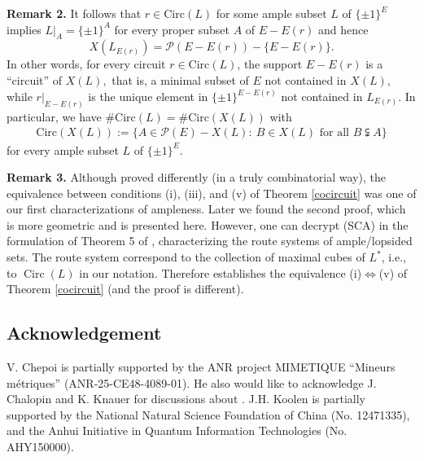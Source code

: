 \documentclass[11pt,a4paper]{amsart}
\theoremstyle{definition}
\numberwithin{equation}{section}
\DeclareMathOperator{\Circ}{Circ}
\newcommand{\covectors}{\ensuremath{L}}
\newcommand{\X}{\ensuremath{X}}
\begin{document}
\noindent
{\bf Remark 2.}  It follows that $r\in \mbox{Circ}({\covectors})$ for some
ample subset  ${\covectors}$ of $\{ \pm 1\}^E$ implies
${\covectors}|_A=\{ \pm 1\}^{A}$ for every proper subset $A$ of $E-E(r)$ and
hence
$${\X}({\covectors}_{E(r)})={\mathcal P}(E-E(r))-\{ E-E(r)\}.$$
In other words, for every circuit $r\in \mbox{Circ}({\covectors})$,
the support $E-E(r)$ is a ``circuit'' of ${\X} ({\covectors}),$
that is, a minimal subset of $E$ not contained in ${\X}
({\covectors}),$ while  $r|_{E-E(r)}$ is the unique element in
$\{ \pm 1\}^{E-E(r)}$ not contained in
${\covectors}_{E(r)}$. In particular, we have
$\# \mbox{Circ}({\covectors})=\#\mbox{Circ}({\X} ({\covectors}))$ with
\begin{align*}
\mbox{Circ}({\X} ({\covectors})):=\{ A\in {\mathcal P}(E)-{\X} ({\covectors}): ~B\in {\X}({\covectors})\mbox{ for all } B\subsetneqq A\}
\end{align*}
for every ample subset ${\covectors}$ of $\{ \pm 1\}^E$.

\medskip\noindent
{\bf Remark 3.} Although proved differently (in a truly combinatorial way), the equivalence between conditions (i), (iii), and (v) of Theorem \ref{cocircuit} was one of our first characterizations of ampleness. Later we found the second proof, which is more geometric and is presented here. However, one can decrypt (SCA) in the formulation of Theorem 5 of \cite{La}, characterizing the route systems of ample/lopsided sets. The route system correspond to the collection of maximal cubes of $\covectors^*$, i.e., to $\Circ({\covectors})$ in our notation. Therefore \cite[Theorem 5]{La} establishes the equivalence (i)$\Longleftrightarrow$(v) of Theorem \ref{cocircuit} (and the proof is different). %



\subsection*{Acknowledgement} V. Chepoi is partially supported by the ANR project MIMETIQUE ``Mineurs métriques'' (ANR-25-CE48-4089-01). He also would like to acknowledge J. Chalopin and K. Knauer for discussions about  \cite[Theorem 5]{La}. J.H. Koolen is partially supported by  the National Natural Science Foundation of China (No. 12471335), and the Anhui Initiative in Quantum Information Technologies (No. AHY150000).
\end{document}
